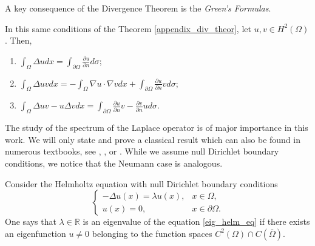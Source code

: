 A key consequence of the Divergence Theorem is the \textit{Green's Formulas}.
\begin{corollary}
    In this same conditions of the Theorem \ref{appendix_div_theor}, let \(u, v \in H^2(\Omega)\). Then,
    \begin{enumerate}
        \item \(\int_\Omega \Delta u dx = \int_{\partial \Omega} \frac{\partial u}{\partial n} d\sigma\);
        \item \(\int_\Omega \Delta u v dx = -\int_\Omega \nabla u \cdot \nabla v dx + \int_{\partial \Omega} \frac{\partial u}{\partial n}v d\sigma\);
        \item \(\int_\Omega \Delta u v - u \Delta v dx= \int_{\partial \Omega} \frac{\partial u}{\partial n}v - \frac{\partial v}{\partial n}u d\sigma\).
    \end{enumerate}
\end{corollary}

The study of the spectrum of the Laplace operator is of major importance in this work. We will only state and prove a classical result which can also be found in numerous textbooks, see \cite{brezis2011functional}, \cite{arendt2010partielle}, \cite{courant2008methods} or \cite{borthwick2020spectral}. While we assume null Dirichlet boundary conditions, we notice that the Neumann case is analogous.

\begin{definition}\label{eig_def}
    Consider the Helmholtz equation with null Dirichlet boundary conditions
    \begin{equation}\label{eig_helm_eq}
        \begin{cases}
            -\Delta u(x) = \lambda u(x), & x \in \Omega, \\
            u(x) = 0, & x \in \partial \Omega.
        \end{cases}
    \end{equation}
    One says that \(\lambda \in \mathbb{R}\) is an eigenvalue of the equation \eqref{eig_helm_eq} if there exists an eigenfunction \(u \neq 0\) belonging to the function spaces \(C^2(\Omega) \cap C(\overline{\Omega})\).
\end{definition}


